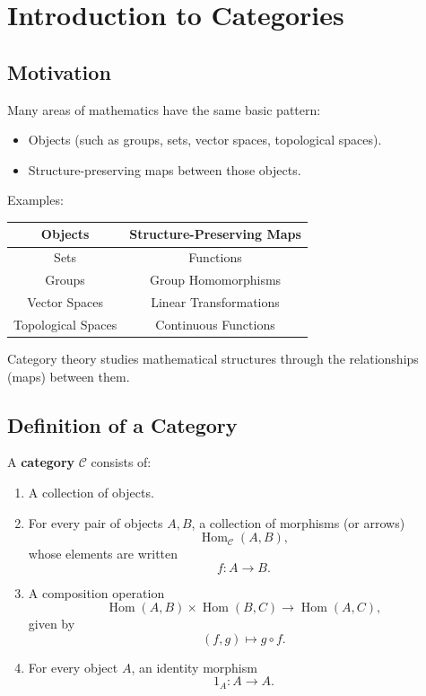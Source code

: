 \section{Introduction to Categories}

\subsection{Motivation}

Many areas of mathematics have the same basic pattern:

\begin{itemize}
    \item Objects (such as groups, sets, vector spaces, topological spaces).
    \item Structure-preserving maps between those objects.
\end{itemize}

Examples:

\begin{center}
\begin{tabular}{|c|c|}
\hline
Objects & Structure-Preserving Maps \\
\hline
Sets & Functions \\
Groups & Group Homomorphisms \\
Vector Spaces & Linear Transformations \\
Topological Spaces & Continuous Functions \\
\hline
\end{tabular}
\end{center}

Category theory studies mathematical structures through the relationships (maps) between them.

\subsection{Definition of a Category}

A \textbf{category} $\mathcal{C}$ consists of:

\begin{enumerate}
    \item A collection of objects.

    \item For every pair of objects $A,B$, a collection of morphisms (or arrows)
    \[
    \operatorname{Hom}_{\mathcal C}(A,B),
    \]
    whose elements are written
    \[
    f:A\to B.
    \]

    \item A composition operation
    \[
    \operatorname{Hom}(A,B)\times\operatorname{Hom}(B,C)
    \longrightarrow
    \operatorname{Hom}(A,C),
    \]
    given by
    \[
    (f,g)\mapsto g\circ f.
    \]

    \item For every object $A$, an identity morphism
    \[
    1_A:A\to A.
    \]
\end{enumerate}

